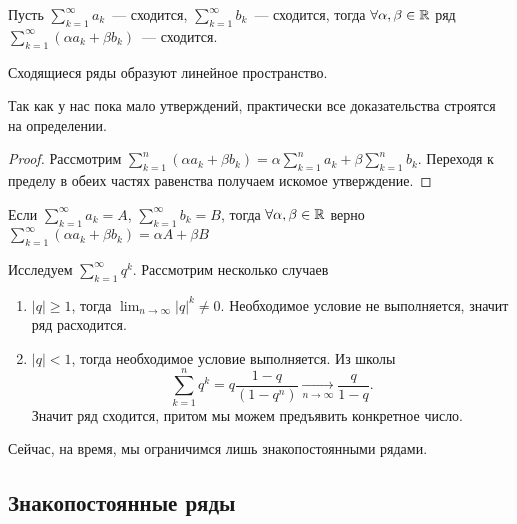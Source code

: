 \documentclass[../main.tex]{subfiles}
\begin{document}
\begin{proposition}[Линейность]
  Пусть $ \sum_{k=1}^{\infty} a_k $~--- сходится, $ \sum_{k=1}^{\infty} b_k  $~--- сходится, тогда $\forall \alpha, \beta \in \mathbb{R}$ ряд $ \sum_{k=1}^{\infty} (\alpha a_k + \beta b_k ) $~--- сходится.
\end{proposition}


\begin{note}
  Сходящиеся ряды образуют линейное пространство.
\end{note}


\begin{note}
  Так как у нас пока мало утверждений, практически все доказательства строятся на определении.
\end{note}


\begin{proof}
  Рассмотрим $ \sum_{k=1}^{n} (\alpha a_k +\beta b_k ) = \alpha \sum_{k=1}^{n} a_k + \beta \sum_{k=1}^{n} b_k $. Переходя к пределу в обеих частях равенства получаем искомое утверждение. 
\end{proof}


\begin{corollary}
  Если $ \sum_{k=1}^{\infty} a_k  = A$, $ \sum_{k=1}^{\infty} b_k = B  $, тогда $\forall \alpha, \beta \in \mathbb{R}$ верно $ \sum_{k=1}^{\infty} (\alpha a_k + \beta b_k ) = \alpha A + \beta B$ 
\end{corollary}

\begin{example}
    Исследуем $ \sum_{k=1}^{\infty} q^{k} $. Рассмотрим несколько случаев \begin{enumerate}
      \item $ \left| q \right| \geq 1$, тогда $ \lim_{n \to \infty} \left| q \right| ^{k} \neq 0$. Необходимое условие не выполняется, значит ряд расходится.
      \item $ \left| q \right| < 1$, тогда необходимое условие выполняется. Из школы $$ \sum_{k=1}^{n} q^{k} = q \frac{1-q}{(1-q^{n})}  \xrightarrow[n \to  \infty ]{} \frac{q}{1-q} .$$ Значит ряд сходится, притом мы можем предъявить конкретное число. 
    \end{enumerate}
\end{example}


\begin{note}
  Сейчас, на время, мы ограничимся лишь знакопостоянными рядами. 
\end{note}

\subsection{Знакопостоянные ряды}
\end{document}
